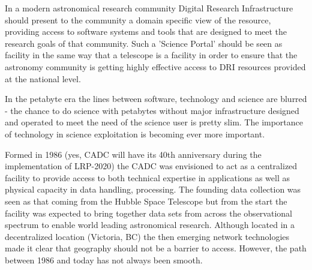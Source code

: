 \documentclass[11pt]{article}
\begin{document}
In a modern astronomical research community Digital Research Infrastructure should present to the community a domain specific view of the resource, providing access to software systems and tools that are designed to meet the research goals of that community.  Such a 'Science Portal' should be seen as facility in the same way that a telescope is a facility in order to ensure that the astronomy community is getting highly effective access to DRI resources provided at the national level.

In the petabyte era the lines between software, technology and science are blurred - the chance to do science with petabytes without major infrastructure designed and operated to meet the need of the science user is pretty slim.  The importance of technology in science exploitation is becoming ever more important.

Formed in 1986 (yes, CADC will have its 40th anniversary during the implementation of LRP-2020) the CADC was envisioned to act as a centralized facility to provide access to both technical expertise in applications as well as physical capacity in data handling, processing. The founding data collection was seen as that coming from the Hubble Space Telescope but from the start the facility was expected to bring together data sets from across the observational spectrum to enable world leading astronomical research. Although located in a decentralized location (Victoria, BC) the then emerging network technologies made it clear that geography should not be a barrier to access.  However, the path between 1986 and today has not always been smooth.

\end{document}

